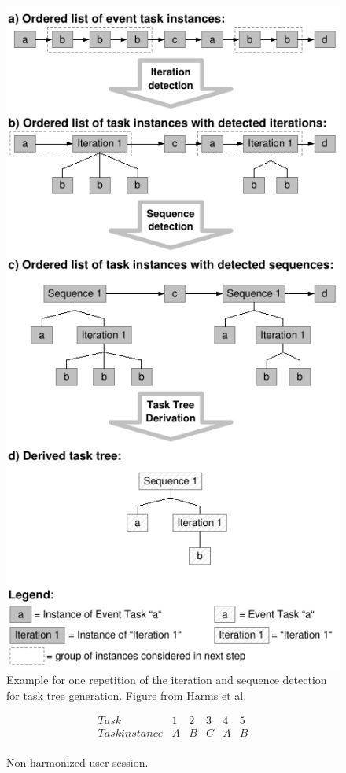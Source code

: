 \begin{figure}
	\centering
	\includegraphics[scale=0.85]{chapters/foundations/TaskDetection.pdf}
	\caption{Example for one repetition of the iteration and sequence detection for task tree generation. Figure from Harms et al.}
	\label{fig:exampletasktreeharms}
\end{figure}

\begin{figure}
\[
\begin{array}{r|ccccc}
	Task & 1 & 2 & 3 & 4 & 5\\
	\hline
	Task instance & A & B & C & A & B\\
\end{array}
\]
\caption{Non-harmonized user session.}
\label{fig:nonharmonized}
\end{figure}


